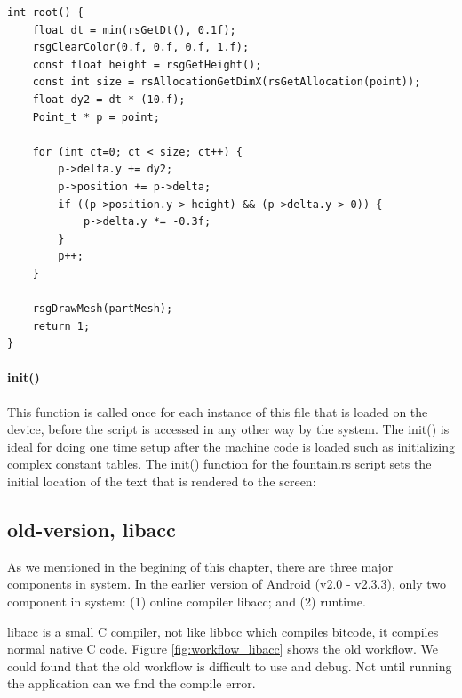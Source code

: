 \begin{lstlisting}
int root() {
    float dt = min(rsGetDt(), 0.1f);
    rsgClearColor(0.f, 0.f, 0.f, 1.f);
    const float height = rsgGetHeight();
    const int size = rsAllocationGetDimX(rsGetAllocation(point));
    float dy2 = dt * (10.f);
    Point_t * p = point;

    for (int ct=0; ct < size; ct++) {
        p->delta.y += dy2;
        p->position += p->delta;
        if ((p->position.y > height) && (p->delta.y > 0)) {
            p->delta.y *= -0.3f;
        }   
        p++;
    }   

    rsgDrawMesh(partMesh);
    return 1;
}
\end{lstlisting} 

\paragraph{init()} This function is called once for each instance of this \RS{} file that is loaded on the device, before the script is accessed in any other way by the \RS{} system. The init() is ideal for doing one time setup after the machine code is loaded such as initializing complex constant tables. The init() function for the fountain.rs script sets the initial location of the text that is rendered to the screen:

\subsection{old-version, libacc}
\label{ss:libacc}
As we mentioned in the begining of this chapter, there are three major components in \RS{} system. In the earlier version of Android (v2.0 - v2.3.3), only two component in \RS{} system: (1) online compiler libacc; and (2) \RS{} runtime.

libacc is a small C compiler, not like libbcc which compiles bitcode, it compiles normal native C code. Figure \ref{fig:workflow_libacc} shows the old workflow. We could found that the old workflow is difficult to use and debug. Not until running the application can we find the compile error.

